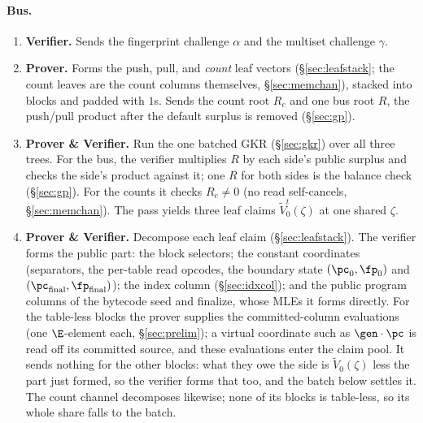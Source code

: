\paragraph{Bus.}
\begin{enumerate}
\item \textbf{Verifier.} Sends the fingerprint challenge $\alpha$ and the multiset challenge $\gamma$.
\item \textbf{Prover.} Forms the push, pull, and \emph{count} leaf vectors (\S\ref{sec:leafstack}; the count leaves are the count columns themselves, \S\ref{sec:memchan}), stacked into blocks and padded with $1$s. Sends the count root $R_c$ and one bus root $R$, the push/pull product after the default surplus is removed (\S\ref{sec:gp}).
\item \textbf{Prover \& Verifier.} Run the one batched GKR (\S\ref{sec:gkr}) over all three trees. For the bus, the verifier multiplies $R$ by each side's public surplus and checks the side's product against it; one $R$ for both sides is the balance check (\S\ref{sec:gp}). For the counts it checks $R_c\neq0$ (no read self-cancels, \S\ref{sec:memchan}). The pass yields three leaf claims $\widetilde V^{t}_0(\zeta)$ at one shared $\zeta$.
\item \textbf{Prover \& Verifier.} Decompose each leaf claim (\S\ref{sec:leafstack}). The verifier forms the public part: the block selectors; the constant coordinates (separators, the per-table read opcodes, the boundary state $(\pc_0,\fp_0)$ and $(\pc_{\mathrm{final}},\fp_{\mathrm{final}})$); the index column (\S\ref{sec:idxcol}); and the public program columns of the bytecode seed and finalize, whose MLEs it forms directly. For the table-less blocks the prover supplies the committed-column evaluations (one $\E$-element each, \S\ref{sec:prelim}); a virtual coordinate such as $\gen\cdot\pc$ is read off its committed source, and these evaluations enter the claim pool. It sends nothing for the other blocks: what they owe the side is $\widetilde V_0(\zeta)$ less the part just formed, so the verifier forms that too, and the batch below settles it. The count channel decomposes likewise; none of its blocks is table-less, so its whole share falls to the batch.
\end{enumerate}

